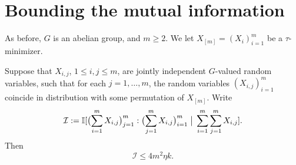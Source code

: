 \section{Bounding the mutual information}

As before, $G$ is an abelian group, and $m\geq 2$.  We let $X_{[m]} = (X_i)_{i =1}^m$ be a $\tau$-minimizer.

\begin{proposition}\label{key}\leanok
Suppose that $X_{i,j}$, $1 \leq i,j \leq m$, are jointly independent $G$-valued random variables, such that for each $j = 1,\dots,m$, the random variables $(X_{i,j})_{i = 1}^m$ coincide in distribution with some permutation of $X_{[m]}$.
  Write
  \[
    {\mathcal I} := \mathbb{I}[ \bigl(\sum_{i=1}^m X_{i,j}\bigr)_{j =1}^{m} : \bigl(\sum_{j=1}^m X_{i,j}\bigr)_{i = 1}^m \; \big| \; \sum_{i=1}^m \sum_{j = 1}^m  X_{i,j} ].
  \]
Then
  \begin{equation}\label{I-ineq}
    {\mathcal I} \leq 4 m^2 \eta k.
  \end{equation}
\end{proposition}


